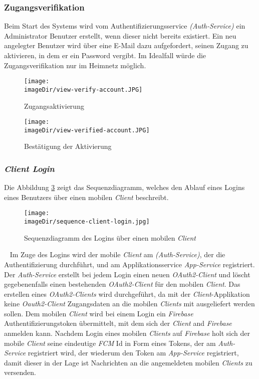 \subsubsection{Zugangsverifikation}
Beim Start des Systems wird vom Authentifizierungsservice \emph{(Auth-Service)} ein Administrator Benutzer erstellt, wenn dieser nicht bereits existiert. Ein neu angelegter Benutzer wird über eine E-Mail dazu aufgefordert, seinen Zugang zu aktivieren, in dem er ein Password vergibt. Im Idealfall würde die Zugangsverifikation nur im Heimnetz möglich.
\begin{figure}[h]
	\centering
	\texttt{[image: \\imageDir/view-verify-account.JPG]}
	\caption{Zugangsaktivierung}
	\label{fig:image-veriy-account}
\end{figure}
\begin{figure}[h]
	\centering
	\texttt{[image: \\imageDir/view-verified-account.JPG]}
	\caption{Bestätigung der Aktivierung}
	\label{fig:image-veriied-account}
\end{figure}

\subsubsection{\emph{Client Login}}
Die Abbildung \ref{fig:image-sequence-client-login} zeigt das Sequenzdiagramm, welches den Ablauf eines Logins eines Benutzers über einen mobilen \emph{Client} beschreibt.
\begin{figure}[h]
	\centering
	\texttt{[image: \\imageDir/sequence-client-login.jpg]}
	\caption{Sequenzdiagramm des Logins über einen mobilen \emph{Client}}
	\label{fig:image-sequence-client-login}
\end{figure}
\ \newline
Im Zuge des Logins wird der mobile \emph{Client} am \emph{(Auth-Service)}, der die Authentifizierung durchführt, und am Applikationsservice \emph{App-Service} registriert. Der \emph{Auth-Service} erstellt bei jedem Login einen neuen \emph{OAuth2-Client} und löscht gegebenenfalls einen bestehenden  \emph{OAuth2-Client} für den mobilen \emph{Client}. Das erstellen eines \emph{OAuth2-Clients} wird durchgeführt, da mit der \emph{Client}-Applikation keine \emph{Oauth2-Client} Zugangsdaten an die mobilen \emph{Clients} mit ausgeliefert werden sollen.
\newline
\newline
Dem mobilen \emph{Client} wird bei einem Login ein \emph{Firebase} Authentifizierungstoken übermittelt, mit dem sich der \emph{Client} and \emph{Firebase} anmelden kann. Nachdem Login eines mobilen \emph{Clients} auf \emph{Firebase} holt sich der mobile \emph{Client} seine eindeutige \emph{FCM} Id in Form eines Tokens, der am \emph{Auth-Service} registriert wird, der wiederum den Token am \emph{App-Service} registriert, damit dieser in der Lage ist Nachrichten an die angemeldeten mobilen \emph{Clients} zu versenden.  


